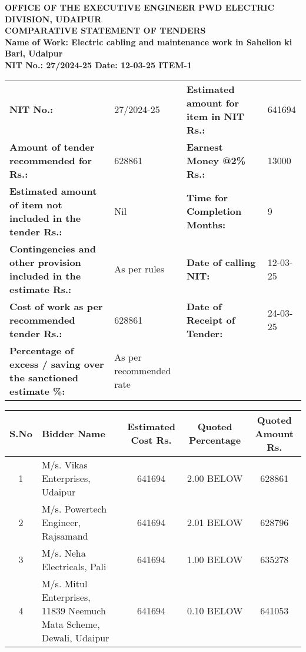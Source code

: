 \documentclass[a4paper,landscape]{article}
\begin{document}
\begin{center}
    \textbf{OFFICE OF THE EXECUTIVE ENGINEER PWD ELECTRIC DIVISION, UDAIPUR} \\
    \vspace{0.5cm}
    \textbf{COMPARATIVE STATEMENT OF TENDERS} \\
    \vspace{0.3cm}
    \textbf{Name of Work: Electric cabling and maintenance work in Sahelion ki Bari, Udaipur} \\
    \textbf{NIT No.: 27/2024-25 \quad Date: 12-03-25 \quad ITEM-1}
\end{center}

\begin{center}
    \begin{tabular}{p{} p{} p{} p{}}
        \toprule
        \textbf{NIT No.:} & 27/2024-25 & \textbf{Estimated amount for item in NIT Rs.:} & 641694 \\
        \textbf{Amount of tender recommended for Rs.:} & 628861 & \textbf{Earnest Money @2\% Rs.:} & 13000 \\
        \textbf{Estimated amount of item not included in the tender Rs.:} & Nil & \textbf{Time for Completion Months:} & 9 \\
        \textbf{Contingencies and other provision included in the estimate Rs.:} & As per rules & \textbf{Date of calling NIT:} & 12-03-25 \\
        \textbf{Cost of work as per recommended tender Rs.:} & 628861 & \textbf{Date of Receipt of Tender:} & 24-03-25 \\
        \textbf{Percentage of excess / saving over the sanctioned estimate \%:} & As per recommended rate & & \\
        \bottomrule
    \end{tabular}
\end{center}

\vspace{0.5cm}
\begin{center}
    \begin{tabular}{|c|p{}|c|c|c|}
        \hline
        \textbf{S.No} & \textbf{Bidder Name} & \textbf{Estimated Cost Rs.} & \textbf{Quoted Percentage} & \textbf{Quoted Amount Rs.} \\
        \hline
        1 & M/s. Vikas Enterprises, Udaipur & 641694 & 2.00 BELOW & 628861 \\
        2 & M/s. Powertech Engineer, Rajsamand & 641694 & 2.01 BELOW & 628796 \\
        3 & M/s. Neha Electricals, Pali & 641694 & 1.00 BELOW & 635278 \\
        4 & M/s. Mitul Enterprises, 11839 Neemuch Mata Scheme, Dewali, Udaipur & 641694 & 0.10 BELOW & 641053 \\
        \hline
    \end{tabular}
\end{center}
\end{document}
